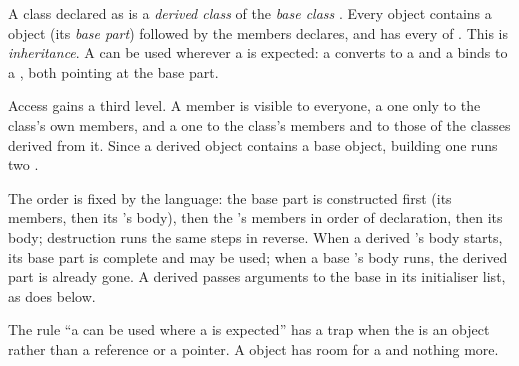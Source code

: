 \begin{definition}\label{def:b2:cpp-polymorphism:inheritance}
A class  declared as  is a \emph{derived class} of the
\emph{base class} . Every  object contains a  object (its \emph{base
part}) followed by the members  declares, and  has every  of . This is
\emph{inheritance}. A  can be used wherever a  is expected: a  converts
to a  and a  binds to a , both pointing at the base part.
\end{definition}

Access gains a third level. A  member is visible to everyone, a  one only to the class's
own members, and a  one to the class's members and to those of the classes derived from it. Since
a derived object contains a base object, building one runs two .

\label{lst:b2:cpp-polymorphism:ctor-order}

\label{out:b2:cpp-polymorphism:ctor-order}

The order is fixed by the language: the base part is constructed first (its members, then its 's body),
then the 's members in order of declaration, then its body; destruction runs the same steps in
reverse. When a derived 's body starts, its base part is complete and may be used; when a base
's body runs, the derived part is already gone. A derived  passes arguments to the base
 in its initialiser list, as  does below.

The rule ``a  can be used where a  is expected'' has a trap when the  is an object rather
than a reference or a pointer. A  object has room for a  and nothing more.

